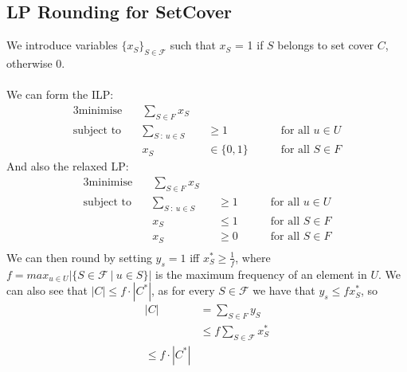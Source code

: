 \documentclass{article}
\theoremstyle{plain}
\theoremstyle{definition}
\begin{document}
    \subsection{LP Rounding for SetCover}
    We introduce variables $\{ x_S \}_{S \in \mathcal{F}}$ such that $x_S$ = 1 if $S$ belongs to set cover $C$, otherwise $0$. \\ \\ 
    We can form the ILP:
    \begin{alignat*}{3}
        \text{minimise}  &\quad \sum_{S \in F} x_S && \\
        \text{subject to} 
        &\quad \sum_{S \ : \ u \in S} &&\geq 1 && \quad \text{ for all $u \in U$} \\
        &\quad x_S &&\in \{0,1\} && \quad \text{ for all $S \in F$}
    \end{alignat*}
    And also the relaxed LP:
    \begin{alignat*}{3}
        \text{minimise}  &\quad \sum_{S \in F} x_S && \\
        \text{subject to} 
        &\quad \sum_{S \ : \ u \in S} &&\geq 1 && \quad \text{ for all $u \in U$} \\
        &\quad x_S &&\leq 1 && \quad \text{ for all $S \in F$} \\ 
        &\quad x_S &&\geq 0 && \quad \text{ for all $S \in F$} \\ 
    \end{alignat*}
    We can then round by setting $y_s = 1$ iff $x_S^* \geq \frac{1}{f}$, where $f = max_{u \in U} |\{ S \in \mathcal{F} \ | \ u \in S \}| $ is the maximum frequency of an element in $U$. We can also see that $|C| \leq f \cdot |C^*|$, as for every $S \in \mathcal{F}$ we have that $y_s \leq f x_S^*$, so 
    \begin{align*}
        |C| &= \sum_{S \in F} y_S \\ 
            &\leq f \sum_{S \in \mathcal{F}} x_S^* \\ 
            \leq f \cdot |C^*|
    \end{align*}
\end{document}
